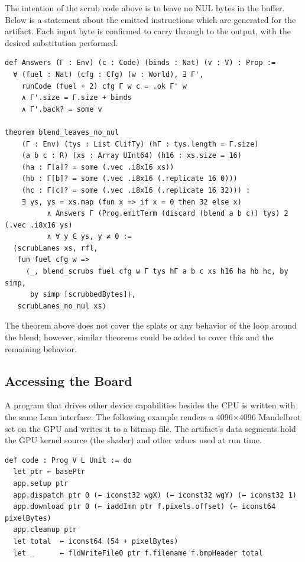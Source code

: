 \documentclass[11pt]{article}
\newenvironment{codeblock}
  {\par\noindent\begin{minipage}{\linewidth}}
  {\end{minipage}\par\noindent}
\begin{document}
The intention of the scrub code above is to leave no NUL bytes in the buffer.
Below is a statement about the emitted instructions which are generated for the
artifact. Each input byte is confirmed to carry through to the output, with the
desired substitution performed.

\begin{codeblock}
\begin{lstlisting}[style=code,basicstyle=\ttfamily\footnotesize,upquote=true,
  morekeywords={theorem,def,by,fun,if,then,else,at,in},morecomment={[l]{--}}]
def Answers (Γ : Env) (c : Code) (binds : Nat) (v : V) : Prop :=
  ∀ (fuel : Nat) (cfg : Cfg) (w : World), ∃ Γ',
    runCode (fuel + 2) cfg Γ w c = .ok Γ' w
    ∧ Γ'.size = Γ.size + binds
    ∧ Γ'.back? = some v

theorem blend_leaves_no_nul
    (Γ : Env) (tys : List ClifTy) (hΓ : tys.length = Γ.size)
    (a b c : R) (xs : Array UInt64) (h16 : xs.size = 16)
    (ha : Γ[a]? = some (.vec .i8x16 xs))
    (hb : Γ[b]? = some (.vec .i8x16 (.replicate 16 0)))
    (hc : Γ[c]? = some (.vec .i8x16 (.replicate 16 32))) :
    ∃ ys, ys = xs.map (fun x => if x = 0 then 32 else x)
          ∧ Answers Γ (Prog.emitTerm (discard (blend a b c)) tys) 2 (.vec .i8x16 ys)
          ∧ ∀ y ∈ ys, y ≠ 0 :=
  ⟨scrubLanes xs, rfl,
   fun fuel cfg w =>
     ⟨_, blend_scrubs fuel cfg w Γ tys hΓ a b c xs h16 ha hb hc, by simp,
      by simp [scrubbedBytes]⟩,
   scrubLanes_no_nul xs⟩
\end{lstlisting}
\end{codeblock}

The theorem above does not cover the splats or any behavior of the loop around
the blend; however, similar theorems could be added to cover this and the
remaining behavior.

\subsection{Accessing the Board}
\label{sec:coordinating}

A program that drives other device capabilities besides the CPU is written with
the same Lean interface. The following example renders a 4096$\times$4096
Mandelbrot set on the GPU and writes it to a bitmap file. The artifact's data
segments hold the GPU kernel source (the shader) and other values used at run time.

\begin{codeblock}
\begin{lstlisting}[style=code,morekeywords={def,do,let,fun,return}]
def code : Prog V L Unit := do
  let ptr ← basePtr
  app.setup ptr
  app.dispatch ptr 0 (← iconst32 wgX) (← iconst32 wgY) (← iconst32 1)
  app.download ptr 0 (← iaddImm ptr f.pixels.offset) (← iconst64 pixelBytes)
  app.cleanup ptr
  let total  ← iconst64 (54 + pixelBytes)
  let _      ← fldWriteFile0 ptr f.filename f.bmpHeader total
\end{lstlisting}
\end{codeblock}
\end{document}
